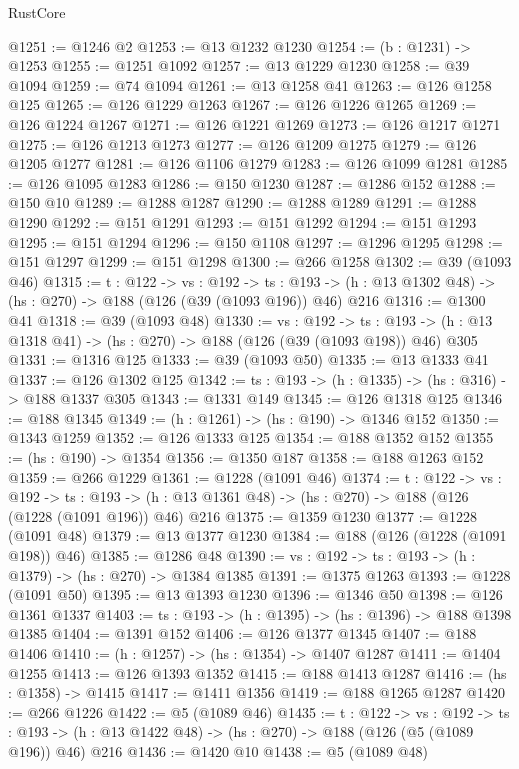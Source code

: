 \begin{lexlean}{RustCore}
\begin{coremodule}
@1251 := @1246 @2
@1253 := @13 @1232 @1230
@1254 := (b : @1231) -> @1253
@1255 := @1251 @1092
@1257 := @13 @1229 @1230
@1258 := @39 @1094
@1259 := @74 @1094
@1261 := @13 @1258 @41
@1263 := @126 @1258 @125
@1265 := @126 @1229 @1263
@1267 := @126 @1226 @1265
@1269 := @126 @1224 @1267
@1271 := @126 @1221 @1269
@1273 := @126 @1217 @1271
@1275 := @126 @1213 @1273
@1277 := @126 @1209 @1275
@1279 := @126 @1205 @1277
@1281 := @126 @1106 @1279
@1283 := @126 @1099 @1281
@1285 := @126 @1095 @1283
@1286 := @150 @1230
@1287 := @1286 @152
@1288 := @150 @10
@1289 := @1288 @1287
@1290 := @1288 @1289
@1291 := @1288 @1290
@1292 := @151 @1291
@1293 := @151 @1292
@1294 := @151 @1293
@1295 := @151 @1294
@1296 := @150 @1108
@1297 := @1296 @1295
@1298 := @151 @1297
@1299 := @151 @1298
@1300 := @266 @1258
@1302 := @39 (@1093 @46)
@1315 := {t : @122} ->
  {vs : @192} ->
  {ts : @193} -> (h : @13 @1302 @48) -> (hs : @270) -> @188 (@126 (@39 (@1093 @196)) @46) @216
@1316 := @1300 @41
@1318 := @39 (@1093 @48)
@1330 := {vs : @192} ->
  {ts : @193} -> (h : @13 @1318 @41) -> (hs : @270) -> @188 (@126 (@39 (@1093 @198)) @46) @305
@1331 := @1316 @125
@1333 := @39 (@1093 @50)
@1335 := @13 @1333 @41
@1337 := @126 @1302 @125
@1342 := {ts : @193} -> (h : @1335) -> (hs : @316) -> @188 @1337 @305
@1343 := @1331 @149
@1345 := @126 @1318 @125
@1346 := @188 @1345
@1349 := (h : @1261) -> (hs : @190) -> @1346 @152
@1350 := @1343 @1259
@1352 := @126 @1333 @125
@1354 := @188 @1352 @152
@1355 := (hs : @190) -> @1354
@1356 := @1350 @187
@1358 := @188 @1263 @152
@1359 := @266 @1229
@1361 := @1228 (@1091 @46)
@1374 := {t : @122} ->
  {vs : @192} ->
  {ts : @193} -> (h : @13 @1361 @48) -> (hs : @270) -> @188 (@126 (@1228 (@1091 @196)) @46) @216
@1375 := @1359 @1230
@1377 := @1228 (@1091 @48)
@1379 := @13 @1377 @1230
@1384 := @188 (@126 (@1228 (@1091 @198)) @46)
@1385 := @1286 @48
@1390 := {vs : @192} -> {ts : @193} -> (h : @1379) -> (hs : @270) -> @1384 @1385
@1391 := @1375 @1263
@1393 := @1228 (@1091 @50)
@1395 := @13 @1393 @1230
@1396 := @1346 @50
@1398 := @126 @1361 @1337
@1403 := {ts : @193} -> (h : @1395) -> (hs : @1396) -> @188 @1398 @1385
@1404 := @1391 @152
@1406 := @126 @1377 @1345
@1407 := @188 @1406
@1410 := (h : @1257) -> (hs : @1354) -> @1407 @1287
@1411 := @1404 @1255
@1413 := @126 @1393 @1352
@1415 := @188 @1413 @1287
@1416 := (hs : @1358) -> @1415
@1417 := @1411 @1356
@1419 := @188 @1265 @1287
@1420 := @266 @1226
@1422 := @5 (@1089 @46)
@1435 := {t : @122} ->
  {vs : @192} ->
  {ts : @193} -> (h : @13 @1422 @48) -> (hs : @270) -> @188 (@126 (@5 (@1089 @196)) @46) @216
@1436 := @1420 @10
@1438 := @5 (@1089 @48)

\end{coremodule}
\end{lexlean}
